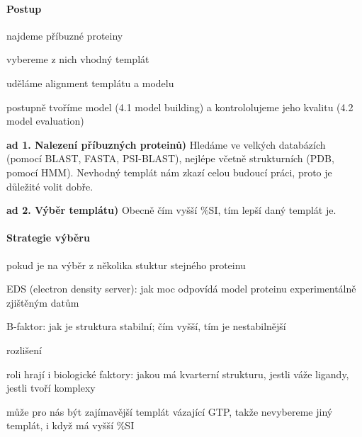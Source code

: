 \documentclass[DIV=8]{scrreprt}
\begin{document}
\paragraph{Postup}
\begin{myEnumerate}[nosep]
    \item najdeme příbuzné proteiny
    \item vybereme z nich vhodný templát
    \item uděláme alignment templátu a modelu
    \item postupně tvoříme model (4.1 model building) a kontrololujeme jeho kvalitu (4.2 model evaluation)
\end{myEnumerate}



\textbf{ad 1. Nalezení příbuzných proteinů)} Hledáme ve velkých databázích (pomocí BLAST, FASTA, PSI-BLAST), nejlépe včetně strukturních (PDB, pomocí HMM). Nevhodný templát nám zkazí celou budoucí práci, proto je důležité volit dobře.

\textbf{ad 2. Výběr templátu)} Obecně čím vyšší \%SI, tím lepší daný templát je.

\paragraph{Strategie výběru}
\begin{myItemize}[nosep]
    \item pokud je na výběr z několika stuktur stejného proteinu
\begin{myItemize}[nosep]
    \item EDS (electron density server): jak moc odpovídá model proteinu experimentálně zjištěným datům
    \item B-faktor: jak je struktura stabilní; čím vyšší, tím je nestabilnější
    \item rozlišení
\end{myItemize}

    \item roli hrají i biologické faktory: jakou má kvarterní strukturu, jestli váže ligandy, jestli tvoří komplexy
\begin{myItemize}[nosep]
    \item může pro nás být zajímavější templát vázající GTP, takže nevybereme jiný templát, i když má vyšší \%SI
\end{myItemize}

\end{myItemize}
\end{document}
